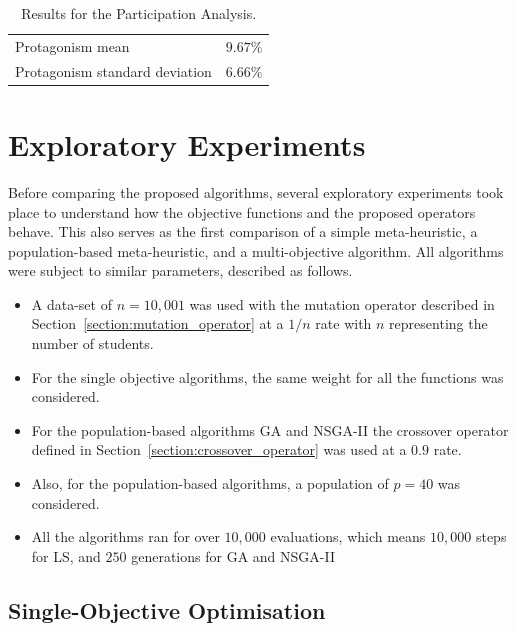 \begin{table}[H]
    \centering
    \begin{tabular}{ll}
    \hline
    Protagonism mean               & $9.67\%$ \\
    Protagonism standard deviation & $6.66\%$ \\
    \hline
    \end{tabular}
    \caption{Results for the Participation Analysis.}
    \label{table:participation_results}
\end{table}

\section{Exploratory Experiments}

Before comparing the proposed algorithms, several exploratory experiments took place to understand how the objective functions and the proposed operators behave. This also serves as the first comparison of a simple meta-heuristic, a population-based meta-heuristic, and a multi-objective algorithm. All algorithms were subject to similar parameters, described as follows.

\begin{itemize}
    \item A data-set of $n=10,001$ was used with the mutation operator described in Section~\ref{section:mutation_operator} at a $1/n$ rate with $n$ representing the number of students.

    \item For the single objective algorithms, the same weight for all the functions was considered.
    
    \item For the population-based algorithms GA and NSGA-II the crossover operator defined in Section~\ref{section:crossover_operator} was used at a $0.9$ rate.

    \item Also, for the population-based algorithms, a population of $p=40$ was considered. 
    
    \item All the algorithms ran for over $10,000$ evaluations, which means $10,000$ steps for LS, and $250$ generations for GA and NSGA-II
\end{itemize}

\subsection{Single-Objective Optimisation}

